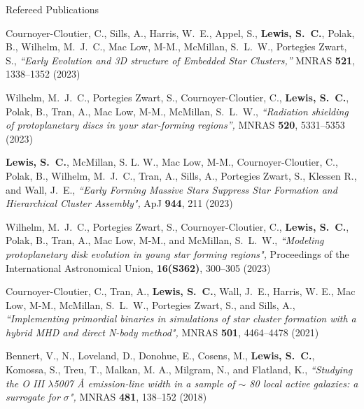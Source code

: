 \documentclass{resume} %
\begin{document}
\begin{rSection}{Refereed Publications}

\begin{etaremune}
\item {Cournoyer-Cloutier}, C., {Sills}, A., {Harris}, W.~E., {Appel}, S., \textbf{{Lewis}, S.~C.}, {Polak}, B., {Wilhelm}, M.~J.~C., {Mac Low}, M-M., {McMillan}, S.~L.~W., {Portegies Zwart}, S., \textit{``Early Evolution and 3D structure of Embedded Star Clusters,''} MNRAS \textbf{521}, 1338--1352 (2023)

\item {Wilhelm}, M.~J.~C., {Portegies Zwart}, S., {Cournoyer-Cloutier}, C., \textbf{{Lewis}, S.~C.}, {Polak}, B., {Tran}, A., {Mac Low}, M-M., {McMillan}, S.~L.~W., \textit{``Radiation shielding of protoplanetary discs in your star-forming regions'',} MNRAS \textbf{520}, 5331--5353 (2023)
 
 \item \textbf{{Lewis}, S.~C.}, {McMillan}, S. L. W., {Mac Low}, M-M., {Cournoyer-Cloutier}, C., {Polak}, B., {Wilhelm}, M.~J.~C., {Tran}, A., {Sills}, A., {Portegies Zwart}, S., {Klessen} R., and {Wall}, J.~E., \textit{``Early Forming Massive Stars Suppress Star Formation and Hierarchical Cluster Assembly",} ApJ \textbf{944}, 211 (2023) %
 
 \item {Wilhelm}, M.~J.~C., {Portegies Zwart}, S., {Cournoyer-Cloutier}, C., \textbf{{Lewis}, S.~C.}, {Polak}, B., {Tran}, A., {Mac Low}, M-M., and {McMillan}, S.~L.~W., \textit{``Modeling protoplanetary disk evolution in young star forming regions",} Proceedings of the International Astronomical Union, \textbf{16(S362)}, 300--305 (2023)
 
\item {Cournoyer-Cloutier}, C., {Tran}, A., \textbf{{Lewis}, S.~C.}, {Wall}, J.~E., {Harris}, W. E., {Mac Low}, M-M., {McMillan}, S.~L.~W., {Portegies Zwart}, S., and {Sills}, A., \textit{``Implementing primordial binaries in simulations of star cluster formation with a hybrid MHD and direct N-body method",} MNRAS \textbf{501}, 4464--4478 (2021) %
  
\item {Bennert}, V., N., {Loveland}, D., {Donohue}, E., {Cosens}, M., \textbf{{Lewis}, S.~C.}, {Komossa}, S., {Treu}, T., {Malkan}, M. A., {Milgram}, N., and {Flatland}, K., \textit{``Studying the O III $\lambda$5007 Å emission-line width in a sample of $\sim$ 80 local active galaxies: a surrogate for $\sigma$",} MNRAS \textbf{481}, 138--152 (2018) %
\end{etaremune}

\end{rSection}
\end{document}
